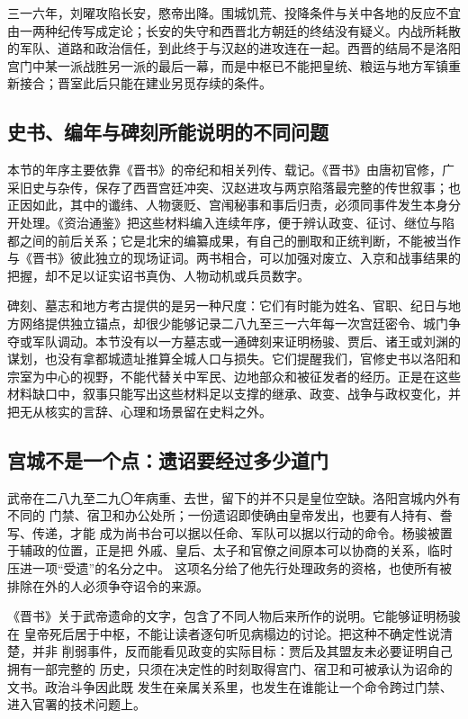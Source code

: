 三一六年，刘曜攻陷长安，愍帝出降。围城饥荒、投降条件与关中各地的反应不宜由一两种纪传写成定论；长安的失守和西晋北方朝廷的终结没有疑义。内战所耗散的军队、道路和政治信任，到此终于与汉赵的进攻连在一起。西晋的结局不是洛阳宫门中某一派战胜另一派的最后一幕，而是中枢已不能把皇统、粮运与地方军镇重新接合；晋室此后只能在建业另觅存续的条件。

\subsection{史书、编年与碑刻所能说明的不同问题}

本节的年序主要依靠《晋书》的帝纪和相关列传、载记。《晋书》由唐初官修，广采旧史与杂传，保存了西晋宫廷冲突、汉赵进攻与两京陷落最完整的传世叙事；也正因如此，其中的谶纬、人物褒贬、宫闱秘事和事后归责，必须同事件发生本身分开处理。《资治通鉴》把这些材料编入连续年序，便于辨认政变、征讨、继位与陷都之间的前后关系；它是北宋的编纂成果，有自己的删取和正统判断，不能被当作与《晋书》彼此独立的现场证词。两书相合，可以加强对废立、入京和战事结果的把握，却不足以证实诏书真伪、人物动机或兵员数字。

碑刻、墓志和地方考古提供的是另一种尺度：它们有时能为姓名、官职、纪日与地方网络提供独立锚点，却很少能够记录二八九至三一六年每一次宫廷密令、城门争夺或军队调动。本节没有以一方墓志或一通碑刻来证明杨骏、贾后、诸王或刘渊的谋划，也没有拿都城遗址推算全城人口与损失。它们提醒我们，官修史书以洛阳和宗室为中心的视野，不能代替关中军民、边地部众和被征发者的经历。正是在这些材料缺口中，叙事只能写出这些材料足以支撑的继承、政变、战争与政权变化，并把无从核实的言辞、心理和场景留在史料之外。

\subsection{宫城不是一个点：遗诏要经过多少道门}

武帝在二八九至二九〇年病重、去世，留下的并不只是皇位空缺。洛阳宫城内外有不同的
门禁、宿卫和办公处所；一份遗诏即使确由皇帝发出，也要有人持有、誊写、传递，才能
成为尚书台可以据以任命、军队可以据以行动的命令。杨骏被置于辅政的位置，正是把
外戚、皇后、太子和官僚之间原本可以协商的关系，临时压进一项“受遗”的名分之中。
这项名分给了他先行处理政务的资格，也使所有被排除在外的人必须争夺诏令的来源。

《晋书》关于武帝遗命的文字，包含了不同人物后来所作的说明。它能够证明杨骏在
皇帝死后居于中枢，不能让读者逐句听见病榻边的讨论。把这种不确定性说清楚，并非
削弱事件，反而能看见政变的实际目标：贾后及其盟友未必要证明自己拥有一部完整的
历史，只须在决定性的时刻取得宫门、宿卫和可被承认为诏命的文书。政治斗争因此既
发生在亲属关系里，也发生在谁能让一个命令跨过门禁、进入官署的技术问题上。

